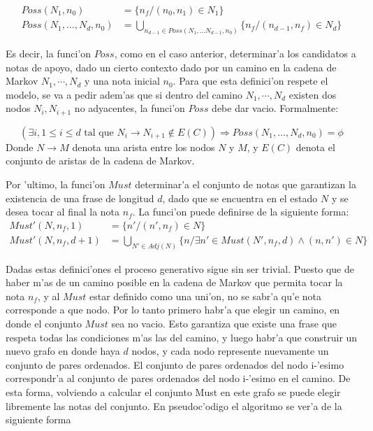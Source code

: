 \begin{align}
Poss(N_1, n_0)&= \{ n_f / (n_0, n_1) \in N_1 \} \nonumber \\
Poss(N_1, \dots, N_d, n_0)&= \bigcup_{n_{d-1} \in Poss(N_1, \dots N_{d-1}, n_0)} \{ n_f / (n_{d-1}, n_f) \in N_d \} \nonumber
\end{align}

Es decir, la funci'on $Poss$, como en el caso anterior, determinar'a los candidatos a notas de apoyo, dado un cierto contexto dado por un
camino en la cadena de Markov $N_1, \cdots, N_d$ y una nota inicial $n_0$. 
Para que esta definici'on respete el modelo, se va a pedir adem'as que si dentro del camino $N_1, \cdots, N_d$ existen dos nodos $N_i, N_{i+1}$ 
no adyacentes, la funci'on $Poss$ debe dar vacio. Formalmente:

$$(\exists i, 1 \leq i \leq d \text{ tal que } N_i \rightarrow N_{i+1} \notin E(C)) \Rightarrow Poss(N_1, \dots, N_d, n_0) = \phi$$
Donde $N \rightarrow M$ denota una arista entre los nodos $N$ y $M$, y $E(C)$ denota el conjunto de aristas de la cadena de Markov. 

Por 'ultimo, la funci'on $Must$ determinar'a el conjunto de notas que garantizan la existencia de una frase de longitud $d$, 
dado que se encuentra en el estado $N$ y se desea tocar al final la nota $n_f$. La funci'on puede definirse de la siguiente forma:
\begin{align}
Must'(N, n_f, 1)   &= \{n' / (n', n_f) \in N\}\nonumber \\
Must'(N, n_f, d+1) &= \bigcup_{N' \in Adj(N)}\{n / \exists n' \in Must(N', n_f, d) \land (n, n') \in N \}\nonumber
\end{align}


Dadas estas definici'ones el proceso generativo sigue sin ser trivial. Puesto que de haber m'as de un camino posible en la cadena de Markov que permita
tocar la nota $n_f$, y al $Must$ estar definido como una uni'on, no se sabr'a qu'e nota corresponde a que nodo. Por lo tanto primero habr'a que elegir
un camino, en donde el conjunto $Must$ sea no vacio. Esto garantiza que existe una frase que respeta todas las condiciones m'as las del camino, y 
luego habr'a que construir un nuevo grafo en donde haya $d$ nodos, y cada nodo represente nuevamente un conjunto de pares ordenados. El conjunto
de pares ordenados del nodo i-'esimo correspondr'a al conjunto de pares ordenados del nodo i-'esimo en el camino. De esta forma, volviendo 
a calcular el conjunto Must en este grafo se puede elegir libremente las notas del conjunto. En pseudoc'odigo el algoritmo se ver'a de la siguiente forma

